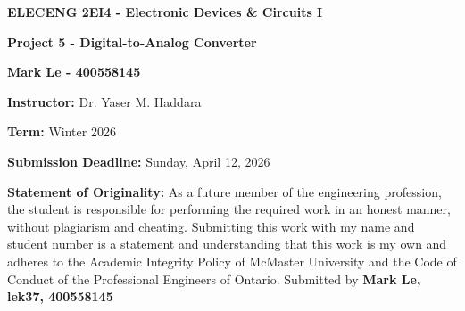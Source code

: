 \documentclass[12pt]{article}
\begin{document}
    
    \begin{titlepage}
    \begin{center}
    \vspace*{\fill}

    {\LARGE \textbf{ELECENG 2EI4 - Electronic Devices \& Circuits I}\par}
    \vspace{2.5cm}

    {\LARGE\bfseries Project 5 - Digital-to-Analog Converter\par}
    \vspace{2.5cm}
    
    {\Large \textbf{Mark Le - 400558145}\par} %
    \vspace{2.5cm}
    
    {\large \textbf{Instructor:} Dr. Yaser M. Haddara\par}
    \vspace{0.5cm}
    {\large \textbf{Term:} Winter 2026 \par} %
    \vspace{0.5cm}
    
    {\large \textbf{Submission Deadline:} Sunday, April 12, 2026\par}
    \end{center}

    \vspace*{\fill}

    \textbf{Statement of Originality:} As a future member of the engineering profession, the student is responsible for performing the required work in an honest manner, without plagiarism and cheating. Submitting this work with my name and student number is a statement and understanding that this work is my own and adheres to the Academic Integrity Policy of McMaster University and the Code of Conduct of the Professional Engineers of Ontario. Submitted by \textbf{Mark Le, lek37, 400558145} %

\end{titlepage}

    \newpage
    \tableofcontents

    \listoffigures

    \listoftables

    \newpage

\end{document}
